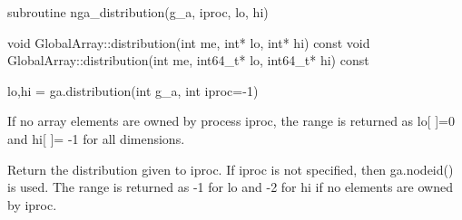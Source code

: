 \documentclass[10pt]{article}
\begin{document}
\begin{fapi}
\begin{fcode}
subroutine nga_distribution(g_a, iproc, lo, hi)
\end{fcode}
\begin{funcargs}
\end{funcargs}
\end{fapi}

\begin{cxxapi}
\begin{cxxcode}
void GlobalArray::distribution(int me, int* lo, int* hi) const
void GlobalArray::distribution(int me, int64_t* lo, int64_t* hi) const
\end{cxxcode}
\begin{funcargs}
\end{funcargs}
\end{cxxapi}

\begin{pyapi}
\begin{pycode}
lo,hi = ga.distribution(int g_a, int iproc=-1)
\end{pycode}
\begin{funcargs}
\end{funcargs}
\end{pyapi}

\local

\begin{desc}

If no array elements are owned by process iproc, the range is returned as
lo[ ]=0 and hi[ ]= -1 for all dimensions.

Return the distribution given to iproc. If iproc is not specified, then
ga.nodeid() is used. The range is returned as -1 for lo and -2 for hi if no
elements are owned by iproc.

\end{desc}

\end{document}
